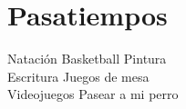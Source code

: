 \section{Pasatiempos \faGamepad}
Natación \textbullet{} Basketball \textbullet{} Pintura\\ 
Escritura \textbullet{} Juegos de mesa \\
Videojuegos \textbullet{} Pasear a mi perro
\sectionsep